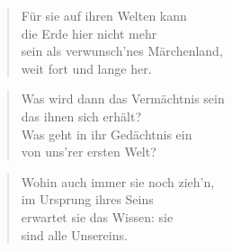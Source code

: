 \documentclass[10pt,a4paper]{article}
\begin{document}
\begin{multicols}{2}
\begin{verse}
Für sie auf ihren Welten kann \\
die Erde hier nicht mehr \\
sein als verwunsch’nes Märchenland, \\
weit fort und lange her. \\
\end{verse}

\begin{verse}
Was wird dann das Vermächtnis sein \\
das ihnen sich erhält? \\
Was geht in ihr Gedächtnis ein \\
von uns’rer ersten Welt? \\
\end{verse}

\begin{verse}
Wohin auch immer sie noch zieh’n, \\
im Ursprung ihres Seins \\
erwartet sie das Wissen: sie \\
sind alle Unsereins. \\
\end{verse}

\end{multicols}
\end{document}
